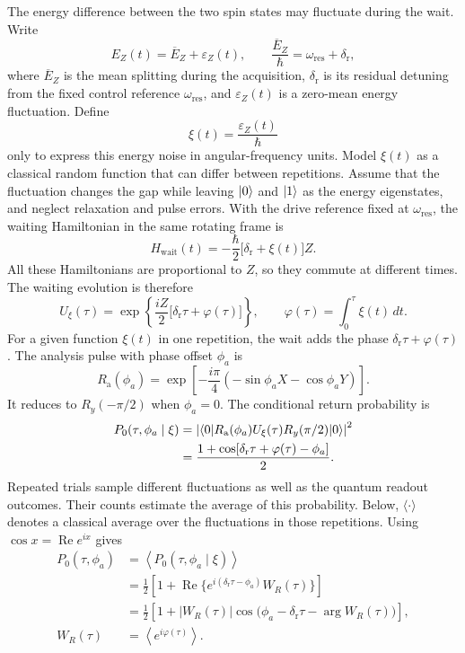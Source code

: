 The energy difference between the two spin states may fluctuate
during the wait. Write
\[
 E_Z(t)=\overline E_Z+\varepsilon_Z(t),\qquad
 \frac{\overline E_Z}{\hbar}
       =\omega_{\mathrm{res}}+\delta_{\mathrm r},
\]
where $\overline E_Z$ is the mean splitting during the acquisition,
$\delta_{\mathrm r}$ is its residual detuning from the fixed control
reference $\omega_{\mathrm{res}}$, and $\varepsilon_Z(t)$ is a
zero-mean energy fluctuation. Define
\[
 \xi(t)=\frac{\varepsilon_Z(t)}{\hbar}
\]
only to express this energy noise in angular-frequency units. Model
$\xi(t)$ as a classical random function that can differ between
repetitions. Assume that the fluctuation changes the gap while
leaving $\lvert 0\rangle$ and $\lvert 1\rangle$
as the energy eigenstates, and neglect relaxation and pulse errors.
With the drive reference fixed at $\omega_{\mathrm{res}}$, the
waiting Hamiltonian in the same rotating frame is
\[
 H_{\mathrm{wait}}(t)
   =-\frac{\hbar}{2}
      \bigl[\delta_{\mathrm r}+\xi(t)\bigr]Z.
\]
All these Hamiltonians are proportional to $Z$, so they commute
at different times. The waiting evolution is therefore
\[
 U_{\xi}(\tau)
   =\exp\!\left\{\frac{iZ}{2}
                 \bigl[\delta_{\mathrm r}\tau+\varphi(\tau)\bigr]
          \right\},
 \qquad
 \varphi(\tau)=\int_0^\tau\xi(t)\,dt.
\]
For a given function $\xi(t)$ in one repetition, the
wait adds the phase $\delta_{\mathrm r}\tau+\varphi(\tau)$.
The analysis pulse with
phase offset $\phi_a$ is
\[
 R_{\mathrm a}(\phi_a)
 =\exp\!\left[-\frac{i\pi}{4}
       (-\sin\phi_a X-\cos\phi_a Y)\right].
\]
It reduces to $R_y(-\pi/2)$ when $\phi_a=0$. The conditional return
probability is
\[
 \begin{aligned}
 P_0(\tau,\phi_a\mid\xi)
   &=\left|\langle 0\rvert R_{\mathrm a}(\phi_a)U_{\xi}(\tau)
                         R_y(\pi/2)\lvert 0\rangle\right|^2\\
   &=\frac{1+\cos[\delta_{\mathrm r}\tau
                         +\varphi(\tau)-\phi_a]}{2}.
 \end{aligned}
\]
Repeated trials sample different fluctuations as well as the
quantum readout outcomes. Their counts estimate the average of
this probability. Below, $\langle\cdot\rangle$ denotes a
classical average over the fluctuations in those repetitions.
Using $\cos x=\operatorname{Re}e^{ix}$ gives
\begin{equation}
 \begin{aligned}
 P_0(\tau,\phi_a)
   &=\left\langle
       P_0(\tau,\phi_a\mid\xi)\right\rangle\\
   &=\frac12\left[1+
       \operatorname{Re}\{e^{i(\delta_{\mathrm r}\tau-\phi_a)}
                            W_R(\tau)\}\right]\\
   &=\frac12\left[1+|W_R(\tau)|
       \cos\bigl(\phi_a-\delta_{\mathrm r}\tau
                         -\arg W_R(\tau)\bigr)\right],\\
 W_R(\tau)&=\left\langle e^{i\varphi(\tau)}\right\rangle.
 \end{aligned}
 \label{eq:measurement-ramsey-noise}
\end{equation}
